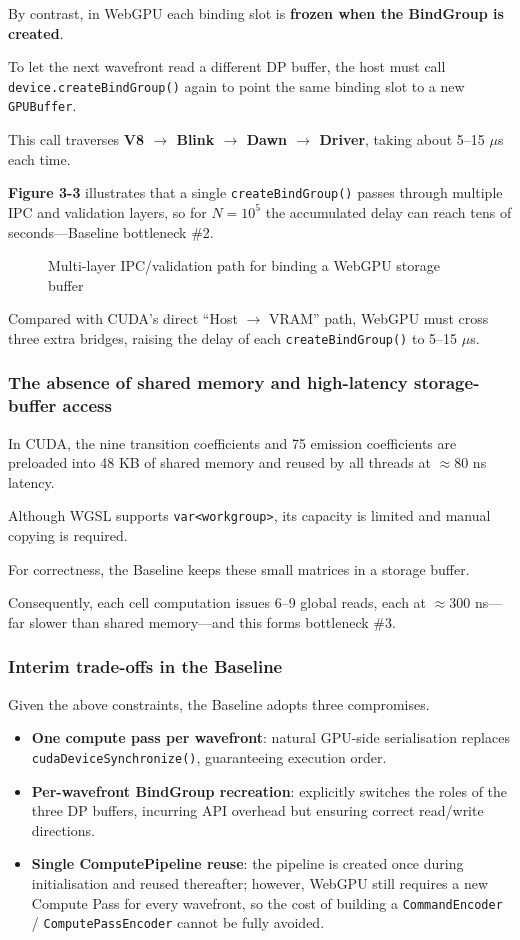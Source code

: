 \documentclass[12pt]{report}
\begin{document}
By contrast, in WebGPU each binding slot is \textbf{frozen when the BindGroup is created}.

To let the next wavefront read a different DP buffer, the host must call \texttt{device.createBindGroup()} again to point the same binding slot to a new \texttt{GPUBuffer}.

This call traverses \textbf{V8 $\rightarrow$ Blink $\rightarrow$ Dawn $\rightarrow$ Driver}, taking about 5–15 $\mu$s each time.

\textbf{Figure 3-3} illustrates that a single \texttt{createBindGroup()} passes through multiple IPC and validation layers, so for $N=10^5$ the accumulated delay can reach tens of seconds—Baseline bottleneck \#2.

\begin{figure}[h]
    \caption{Multi-layer IPC/validation path for binding a WebGPU storage buffer}
    \label{fig:ipc_path}
\end{figure}

Compared with CUDA’s direct ``Host $\rightarrow$ VRAM'' path, WebGPU must cross three extra bridges, raising the delay of each \texttt{createBindGroup()} to 5–15 $\mu$s.

\subsubsection{The absence of shared memory and high-latency storage-buffer access}
In CUDA, the nine transition coefficients and 75 emission coefficients are preloaded into 48 KB of shared memory and reused by all threads at $\approx$80 ns latency.

Although WGSL supports \texttt{var<workgroup>}, its capacity is limited and manual copying is required.

For correctness, the Baseline keeps these small matrices in a storage buffer.

Consequently, each cell computation issues 6–9 global reads, each at $\approx$300 ns—far slower than shared memory—and this forms bottleneck \#3.

\subsubsection{Interim trade-offs in the Baseline}
Given the above constraints, the Baseline adopts three compromises.
\begin{itemize}
    \item \textbf{One compute pass per wavefront}: natural GPU-side serialisation replaces \texttt{cudaDeviceSynchronize()}, guaranteeing execution order.
    \item \textbf{Per-wavefront BindGroup recreation}: explicitly switches the roles of the three DP buffers, incurring API overhead but ensuring correct read/write directions.
    \item \textbf{Single ComputePipeline reuse}: the pipeline is created once during initialisation and reused thereafter; however, WebGPU still requires a new Compute Pass for every wavefront, so the cost of building a \texttt{CommandEncoder} / \texttt{ComputePassEncoder} cannot be fully avoided.
\end{itemize}
\end{document}
